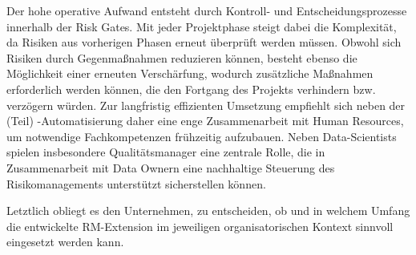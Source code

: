 Der hohe operative Aufwand entsteht durch Kontroll- und Entscheidungsprozesse innerhalb der Risk Gates. 
Mit jeder Projektphase steigt dabei die Komplexität, da Risiken aus vorherigen Phasen erneut überprüft werden müssen. 
Obwohl sich Risiken durch Gegenmaßnahmen reduzieren können, besteht ebenso die Möglichkeit einer erneuten Verschärfung, 
wodurch zusätzliche Maßnahmen erforderlich werden können, die den Fortgang des Projekts verhindern bzw. verzögern würden. 
Zur langfristig effizienten Umsetzung empfiehlt sich neben der (Teil) -Automatisierung daher eine enge Zusammenarbeit mit Human Resources, 
um notwendige Fachkompetenzen frühzeitig aufzubauen. 
Neben Data-Scientists spielen insbesondere Qualitätsmanager eine zentrale Rolle, die in Zusammenarbeit mit Data Ownern eine nachhaltige Steuerung des Risikomanagements unterstützt sicherstellen können.

Letztlich obliegt es den Unternehmen, zu entscheiden, 
ob und in welchem Umfang die entwickelte RM-Extension 
im jeweiligen organisatorischen Kontext sinnvoll eingesetzt werden kann.